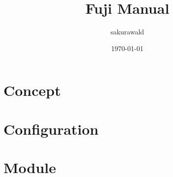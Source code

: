 \documentclass[10pt,oneside]{book}
\begin{document}
    \title{Fuji Manual}
    \author{sakurawald}
    \date{\today\\\version}

    \maketitle
    \tableofcontents


    \mainmatter


    \chapter{Concept}\label{ch:concept}
    


    \chapter{Configuration}\label{ch:configuration}
    


    \chapter{Module}\label{ch:module}
    
\end{document}
